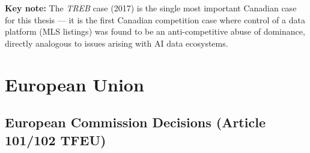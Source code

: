 \documentclass[12pt, letterpaper]{article}
\begin{document}
\begin{keynote}
\textbf{Key note:} The \textit{TREB} case (2017) is the single most important Canadian case for this thesis --- it is the first Canadian competition case where control of a data platform (MLS listings) was found to be an anti-competitive abuse of dominance, directly analogous to issues arising with AI data ecosystems.
\end{keynote}

\bigskip

\section{European Union}

\subsection{European Commission Decisions (Article 101/102 TFEU)}
\end{document}
